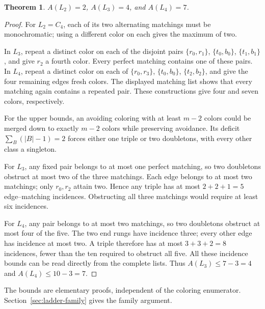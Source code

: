 \documentclass[11pt,letterpaper]{article}
\newtheorem{theorem}{Theorem}
\begin{document}
\begin{theorem}
$A(L_2)=2$, $A(L_3)=4$, and $A(L_4)=7$.
\end{theorem}
\begin{proof}
For $L_2=C_4$, each of its two alternating matchings must be monochromatic;
using a different color on each gives the maximum of two.

In $L_3$, repeat a distinct color on each of the disjoint pairs
$\{r_0,r_1\}$, $\{t_0,b_0\}$, $\{t_1,b_1\}$, and give $r_2$ a fourth color.
Every perfect matching contains one of these pairs. In $L_4$, repeat a
distinct color on each of $\{r_0,r_3\}$, $\{t_0,b_0\}$, $\{t_2,b_2\}$,
and give the four remaining edges fresh colors. The displayed matching list
shows that every matching again contains a repeated pair. These constructions
give four and seven colors, respectively.

For the upper bounds, an avoiding coloring with at least $m-2$ colors could
be merged down to exactly $m-2$ colors while preserving avoidance. Its
deficit $\sum_B(|B|-1)=2$ forces either one triple or two doubletons,
with every other class a singleton.

For $L_3$, any fixed pair belongs to at most one perfect matching, so two
doubletons obstruct at most two of the three matchings. Each edge belongs
to at most two matchings; only $r_0,r_2$ attain two. Hence any triple has
at most $2+2+1=5$ edge--matching incidences. Obstructing all three
matchings would require at least six incidences.

For $L_4$, any pair belongs to at most two matchings, so two doubletons
obstruct at most four of the five. The two end rungs have incidence three;
every other edge has incidence at most two. A triple therefore has at
most $3+3+2=8$ incidences, fewer than the ten required to obstruct all five.
All these incidence bounds can be read directly from the complete lists.
Thus $A(L_3)\le7-3=4$ and $A(L_4)\le10-3=7$.
\end{proof}
The bounds are elementary proofs, independent of the coloring enumerator.
Section~\ref{sec:ladder-family} gives the family argument.

\newpage
\end{document}
